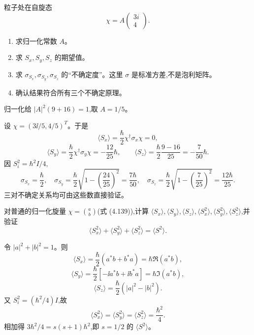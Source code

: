 \begin{question}
粒子处在自旋态
\[
\chi=A\begin{pmatrix}3i\\4\end{pmatrix}.
\]
\begin{enumerate}
\item 求归一化常数 $A$。
\item 求 $S_x,S_y,S_z$ 的期望值。
\item 求 $\sigma_{S_x},\sigma_{S_y},\sigma_{S_z}$ 的“不确定度”。这里 $\sigma$ 是标准方差,不是泡利矩阵。
\item 确认结果符合所有三个不确定原理。
\end{enumerate}
\end{question}
\begin{solution}

归一化给 $|A|^2(9+16)=1$,取 $A=1/5$。

设 $\chi=(3\ii/5,4/5)^T$。于是
\[
\langle S_x\rangle=\frac\hbar2\chi^\dagger\sigma_x\chi=0,
\]
\[
\langle S_y\rangle=\frac\hbar2\chi^\dagger\sigma_y\chi=-\frac{12}{25}\hbar,
\qquad
\langle S_z\rangle=\frac\hbar2\frac{9-16}{25}=-\frac{7}{50}\hbar.
\]
因 $S_i^2=\hbar^2I/4$,
\[
\sigma_{S_x}=\frac\hbar2,
\quad
\sigma_{S_y}=\frac\hbar2\sqrt{1-\left(\frac{24}{25}\right)^2}=\frac{7\hbar}{50},
\quad
\sigma_{S_z}=\frac\hbar2\sqrt{1-\left(\frac{7}{25}\right)^2}=\frac{12\hbar}{25}.
\]
三对不确定关系均可由这些数直接验证。

\end{solution}

\begin{question}
对普通的归一化旋量 $\chi=\binom{a}{b}$(式 (4.139)),计算 $\langle S_x\rangle,\langle S_y\rangle,\langle S_z\rangle,\langle S_x^2\rangle,\langle S_y^2\rangle,\langle S_z^2\rangle$,并验证
\[
\langle S_x^2\rangle+\langle S_y^2\rangle+\langle S_z^2\rangle=\langle S^2\rangle.
\]

\par\smallskip
{}

\end{question}
\begin{solution}

令 $|a|^2+|b|^2=1$。则
\[
\langle S_x\rangle=\frac\hbar2(a^*b+b^*a)=\hbar\Re(a^*b),
\]
\[
\langle S_y\rangle=\frac\hbar2[-\ii a^*b+\ii b^*a]=\hbar\Im(a^*b),
\]
\[
\langle S_z\rangle=\frac\hbar2(|a|^2-|b|^2).
\]
又 $S_i^2=(\hbar^2/4)I$,故
\[
\langle S_x^2\rangle=\langle S_y^2\rangle=\langle S_z^2\rangle=\frac{\hbar^2}{4}.
\]
相加得 $3\hbar^2/4=s(s+1)\hbar^2$,即 $s=1/2$ 的 $\langle S^2\rangle$。

\end{solution}

